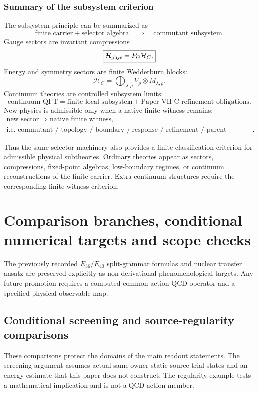 \documentclass[12pt,a4paper]{article}
\begin{document}
\subsubsection{Summary of the subsystem criterion}

The subsystem principle can be summarized as
\[
\boxed{
\text{finite carrier}
+
\text{selector algebra}
\quad\Longrightarrow\quad
\text{commutant subsystem}.
}
\]
Gauge sectors are invariant compressions:
\[
\boxed{
\mathcal H_{\rm phys}=P_G\mathcal H_C.
}
\]
Energy and symmetry sectors are finite Wedderburn blocks:
\[
\boxed{
\mathcal H_C
=
\bigoplus_{\lambda,\rho}
V_\rho\otimes M_{\lambda,\rho}.
}
\]
Continuum theories are controlled subsystem limits:
\[
\boxed{
\text{continuum QFT}
=
\text{finite local subsystem}
+
\text{Paper VII-C refinement obligations}.
}
\]
New physics is admissible only when a native finite witness remains:
\[
\boxed{
\begin{gathered}
\text{new sector}
\Rightarrow
\text{native finite witness},\\
\text{i.e. commutant / topology / boundary / response / refinement / parent completion}.
\end{gathered}
}
\]

Thus the same selector machinery also provides a finite classification criterion for admissible physical subtheories.  Ordinary theories appear as sectors, compressions, fixed-point algebras, low-boundary regimes, or continuum reconstructions of the finite carrier.  Extra continuum structures require the corresponding finite witness criterion.



\section{Comparison branches, conditional numerical targets and scope checks}
\label{p13:sec:v237-d7}
The previously recorded $E_{36}$/$E_{40}$ split-grammar formulas and nuclear transfer ansatz are preserved explicitly as non-derivational phenomenological targets. Any future promotion requires a computed common-action QCD operator and a specified physical observable map.
\subsection{Conditional screening and source-regularity comparisons}
\label{p10:app:v2187-readout-domain-comparisons}
These comparisons protect the domains of the main readout statements.
The screening argument assumes actual same-owner static-source trial states
and an energy estimate that this paper does not construct.  The regularity
example tests a mathematical implication and is not a QCD action member.
\end{document}
